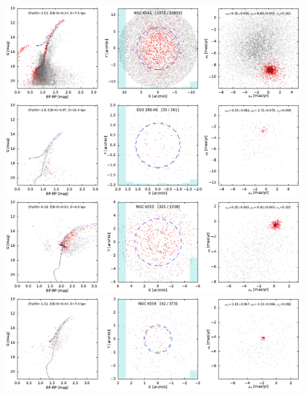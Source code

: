 \documentclass[usenatbib]{mnras}
\begin{document}
\clearpage\begin{figure}
\contcaption{}
\includegraphics{figs/NGC_6541.pdf}
\includegraphics{figs/ESO-SC06_ESO280.pdf}
\includegraphics{figs/NGC_6553.pdf}
\includegraphics{figs/NGC_6558.pdf}
\end{figure}
\end{document}
